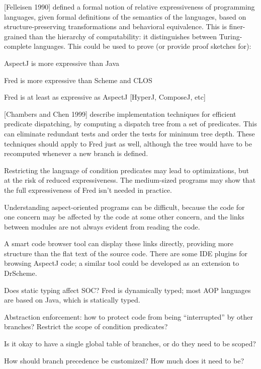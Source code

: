 \documentclass[landscape]{slides}
\begin{document}
\begin{slide}
[Felleisen 1990] defined a formal notion of relative expressiveness of
programming languages, given formal definitions of the semantics of
the languages, based on structure-preserving transformations and
behavioral equivalence.  This is finer-grained than the hierarchy of
computability: it distinguishes between Turing-complete languages.
This could be used to prove (or provide proof sketches for):
\begin{bullets}
\item AspectJ is more expressive than Java
\item Fred is more expressive than Scheme and CLOS
\item Fred is at least as expressive as AspectJ [HyperJ, ComposeJ, etc]
\end{bullets}
\end{slide}

\begin{slide}
[Chambers and Chen 1999] describe implementation techniques for
efficient predicate dispatching, by computing a dispatch tree from a
set of predicates.  This can eliminate redundant tests and order the
tests for minimum tree depth.  These techniques should apply to Fred
just as well, although the tree would have to be recomputed whenever a
new branch is defined.

Restricting the language of condition predicates may lead to
optimizations, but at the risk of reduced expressiveness.  The
medium-sized programs may show that the full expressiveness of Fred
isn't needed in practice.
\end{slide}

\begin{slide}
Understanding aspect-oriented programs can be difficult, because the
code for one concern may be affected by the code at some other
concern, and the links between modules are not always evident from
reading the code.

A smart code browser tool can display these links directly, providing
more structure than the flat text of the source code.  There are some
IDE plugins for browsing AspectJ code; a similar tool could be
developed as an extension to DrScheme.
\end{slide}

\begin{slide}
\begin{bullets}
\item Does static typing affect SOC?  Fred is dynamically typed; most
      AOP languages are based on Java, which is statically typed.
\item Abstraction enforcement: how to protect code from being
      ``interrupted'' by other branches?  Restrict the scope of
      condition predicates?
\item Is it okay to have a single global table of branches, or do they
      need to be scoped?
\item How should branch precedence be customized?  How much does it
      need to be?
\end{bullets}
\end{slide}
\end{document}
